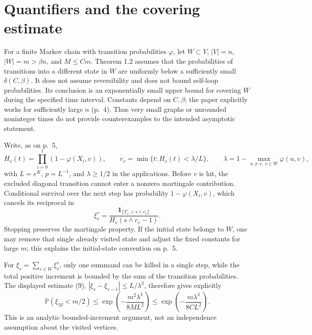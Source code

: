 \documentclass[10pt]{article}
\begin{document}
\section*{Quantifiers and the covering estimate}
For a finite Markov chain with transition probabilities \(\varphi\), let \(W\subset V\), \(|V|=n\), \(|W|=m>\beta n\), and \(M\leq Cm\). Theorem 1.2 assumes that the probabilities of transitions into a different state in \(W\) are uniformly below a sufficiently small \(\delta(C,\beta)\). It does not assume reversibility and does not bound self-loop probabilities. Its conclusion is an exponentially small upper bound for covering \(W\) during the specified time interval. Constants depend on \(C,\beta\); the paper explicitly works for sufficiently large \(n\) (p. 4). Thus very small graphs or unrounded noninteger times do not provide counterexamples to the intended asymptotic statement.\par
Write, as on p. 5, \[H_v(t)=\prod_{i=0}^t(1-\varphi(X_i,v)),\qquad
 r_v=\min\{t:H_v(t)<\lambda/L\},\qquad
 \lambda=1-\max_{u\ne v,\ v\in W}\varphi(u,v),\] with \(L=e^K\), \(p=L^{-1}\), and \(\lambda\geq1/2\) in the applications. Before \(v\) is hit, the excluded diagonal transition cannot enter a nonzero martingale contribution. Conditional survival over the next step has probability \(1-\varphi(X_i,v)\), which cancels its reciprocal in \[\xi_s^v=\frac{\mathbf 1_{\{T_v>s\wedge r_v\}}}
                    {H_v(s\wedge r_v-1)}.\] Stopping preserves the martingale property. If the initial state belongs to \(W\), one may remove that single already visited state and adjust the fixed constants for large \(m\); this explains the initial-state convention on p. 5.\par
For \(\xi_s=\sum_{v\in W}\xi_s^v\), only one summand can be killed in a single step, while the total positive increment is bounded by the sum of the transition probabilities. The displayed estimate (9), \(|\xi_s-\xi_{s-1}|\leq L/\lambda^2\), therefore gives explicitly \[\mathbb P(\xi_M<m/2)\leq
 \exp\left(-\frac{m^2\lambda^4}{8ML^2}\right)
 \leq \exp\left(-\frac{m\lambda^4}{8CL^2}\right).\] This is an analytic bounded-increment argument, not an independence assumption about the visited vertices.\par
\end{document}
